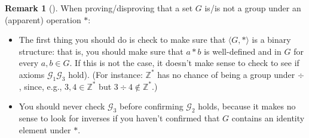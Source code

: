 \documentclass[10pt,]{book}
\theoremstyle{plain}
\theoremstyle{definition}
\theoremstyle{definition}
\newtheorem{remark}[theorem]{Remark}
\theoremstyle{definition}
\theoremstyle{definition}
\numberwithin{equation}{section}
\def\Z{\mathbb{Z}}
\def\G{\mathcal{G}}
\begin{document}
\begin{remark}[]\label{remark-7}
When proving/disproving that a set \(G\) is/is not a group under an (apparent) operation \(*\): \leavevmode%
\begin{itemize}[label=\textbullet]
\item{}The first thing you should do is check to make sure that  \(\langle G,*\rangle\) is a binary structure: that is, you should make sure that \(a*b\) is well-defined and in \(G\) for every \(a, b \in G\). If this is not the case, it doesn't make sense to check to see if axioms \(\G_1\)\textendash{}\(\G_3\) hold). (For instance: \(\Z^*\) has no chance of being a group under \(\div\), since, e.g., \(3,4\in \Z^*\) but \(3 \div 4 \not\in\Z^*\).)%
\item{}You should never check \(\G_3\) before confirming \(\G_2\) holds, because it makes no sense to look for inverses if you haven't confirmed that \(G\) contains an identity element under \(*\).%
\end{itemize}
%
\end{remark}
\typeout{************************************************}
\typeout{************************************************}
\end{document}
